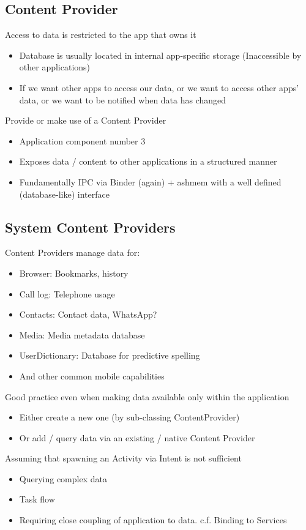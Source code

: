 \documentclass{article}
\begin{document}
\subsection{Content	Provider}
\begin{flushleft}
Access to data is restricted to the app that owns it
\begin{itemize}
  \item Database is usually located in internal app-specific storage (Inaccessible by other applications)
  \item If we want other apps to access our data, or we want to access other apps’ data, or we want to be notified when data has changed
\end{itemize}
Provide or make use of a Content Provider
\begin{itemize}
  \item Application component number 3 
  \item Exposes data / content to other applications in a structured manner 
  \item Fundamentally IPC via Binder (again) + ashmem with a well defined (database-like) interface
\end{itemize}
\end{flushleft}

\subsection{System Content Providers}

\begin{flushleft}
Content Providers manage data for:
\begin{itemize}
  \item Browser: Bookmarks, history
  \item Call log: Telephone usage
  \item Contacts: Contact data, WhatsApp?
  \item Media: Media metadata database
  \item UserDictionary: Database for predictive spelling
  \item And other common mobile capabilities
\end{itemize}
Good practice even when making data available only within the application
\begin{itemize}
  \item Either create a new one (by sub-classing ContentProvider) 
  \item Or add / query data via an existing / native Content Provider
\end{itemize}
Assuming that spawning an Activity via Intent is not sufficient
\begin{itemize}
  \item Querying complex data 
  \item Task flow 
  \item Requiring close coupling of application to data. c.f. Binding to Services
\end{itemize}
\end{flushleft}
\end{document}
